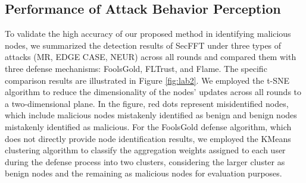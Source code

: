 \documentclass[lettersize,journal]{IEEEtran}
\begin{document}
\subsection{Performance of Attack Behavior Perception}
To validate the high accuracy of our proposed method in identifying malicious nodes, we summarized the detection results of SecFFT under three types of attacks (MR, EDGE CASE, NEUR) across all rounds and compared them with three defense mechanisms: FoolsGold, FLTrust, and Flame. The specific comparison results are illustrated in Figure \ref{fig:lab2}. We employed the t-SNE algorithm to reduce the dimensionality of the nodes' updates across all rounds to a two-dimensional plane. In the figure, red dots represent misidentified nodes, which include malicious nodes mistakenly identified as benign and benign nodes mistakenly identified as malicious. For the FoolsGold defense algorithm, which does not directly provide node identification results, we employed the KMeans clustering algorithm to classify the aggregation weights assigned to each user during the defense process into two clusters, considering the larger cluster as benign nodes and the remaining as malicious nodes for evaluation purposes.
\end{document}
